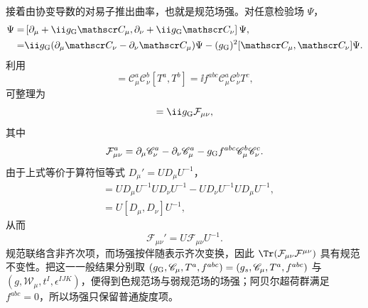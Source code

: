 \begin{derivation}
接着由协变导数的对易子推出曲率，也就是规范场强。对任意检验场 $\Psi$，
\begin{align*}
 [D_\mu,D_\nu]\Psi
 =&\left[\partial_\mu+\ii g_{\rm G}\mathscr C_\mu,
 \partial_\nu+\ii g_{\rm G}\mathscr C_\nu\right]\Psi,\\
 =&\ii g_{\rm G}(\partial_\mu \mathscr C_\nu-\partial_\nu \mathscr C_\mu)\Psi
 -(g_{\rm G})^2[\mathscr C_\mu,\mathscr C_\nu]\Psi.
\end{align*}
利用
\begin{equation*}
 [\mathscr C_\mu,\mathscr C_\nu]
 =\mathscr C_\mu^a\mathscr C_\nu^b[T^a,T^b]
 =\ii f^{abc}\mathscr C_\mu^a\mathscr C_\nu^bT^c,
\end{equation*}
可整理为
\begin{equation*}
 [D_\mu,D_\nu]
 =\ii g_{\rm G}\mathcal F_{\mu\nu},
\end{equation*}
其中
\begin{equation*}
 {
 \mathcal F_{\mu\nu}^a
 =\partial_\mu \mathscr C_\nu^a-\partial_\nu \mathscr C_\mu^a
 -g_{\rm G}f^{abc}\mathscr C_\mu^b\mathscr C_\nu^c.}
\end{equation*}
由于上式等价于算符恒等式 $D_\mu'=UD_\mu U^{-1}$，
\begin{align*}
 [D_\mu',D_\nu']
 &=UD_\mu U^{-1}UD_\nu U^{-1}
  -UD_\nu U^{-1}UD_\mu U^{-1},\\
 &=U[D_\mu,D_\nu]U^{-1},
\end{align*}
从而
\begin{equation*}
 {\mathcal F_{\mu\nu}'=U\mathcal F_{\mu\nu}U^{-1}.}
\end{equation*}
规范联络含非齐次项，而场强按伴随表示齐次变换，因此 $\Tr(\mathcal F_{\mu\nu}\mathcal F^{\mu\nu})$ 具有规范不变性。把这一一般结果分别取 $(g_{\rm G},\mathscr C_\mu,T^a,f^{abc})=(g_s,\mathscr C_\mu,T^a,f^{abc})$ 与 $(g,\mathcal W_\mu,t^I,\epsilon^{IJK})$，便得到色规范场与弱规范场的场强；阿贝尔超荷群满足 $f^{abc}=0$，所以场强只保留普通旋度项。
\end{derivation}
